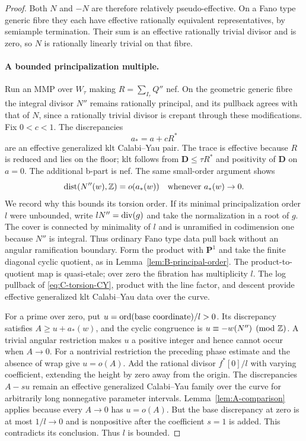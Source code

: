 \begin{proof}
Both $N$ and $-N$ are therefore relatively pseudo-effective.  On a
Fano type generic fibre they each have effective rationally equivalent
representatives, by semiample termination.  Their sum is an effective
rationally trivial divisor and is zero, so $N$ is rationally linearly
trivial on that fibre.

\paragraph{A bounded principalization multiple.}
Run an MMP over $W_\tau$ making $R=\sum_{I_\tau}Q''$ nef.  On the
geometric generic fibre the integral divisor $N''$ remains rationally
principal, and its pullback agrees with that of $N$, since a
rationally trivial divisor is crepant through these modifications.
Fix $0<c<1$.  The discrepancies
\begin{equation}\label{eq:C-torsion-CY}
                              a_*=a+cR^*
\end{equation}
are an effective generalized klt Calabi--Yau pair.  The trace is
effective because $R$ is reduced and lies on the floor; klt follows
from $\mathbf D\leq\tau R^*$ and positivity of $\mathbf D$ on
$a=0$.  The additional b-part is nef.  The same small-order argument
shows
\[
       \operatorname{dist}(N''(w),\mathbb Z)=o(a_*(w))
                          \quad\text{whenever }a_*(w)\to0.
\]
We record why this bounds its torsion order.  If its minimal
principalization order $l$ were unbounded, write
$lN''=\operatorname{div}(g)$ and take the normalization in a root of $g$.
The cover is connected by minimality of $l$ and is unramified in
codimension one because $N''$ is integral.  Thus ordinary Fano type
data pull back without an angular ramification boundary.  Form the
product with $\mathbf P^1$ and take the finite diagonal cyclic
quotient, as in Lemma~\ref{lem:B-principal-order}.  The product-to-quotient
map is quasi-etale; over zero the fibration has multiplicity $l$.
The log pullback of \eqref{eq:C-torsion-CY}, product with the line
factor, and descent provide effective generalized klt Calabi--Yau
data over the curve.

For a prime over zero, put
$u=\operatorname{ord}(\text{base coordinate})/l>0$.  Its discrepancy satisfies
$A\geq u+a_*(w)$, and the cyclic congruence is
$u\equiv-w(N'')\pmod{\mathbb Z}$.  A trivial angular restriction makes $u$
a positive integer and hence cannot occur when $A\to0$.  For a
nontrivial restriction the preceding phase estimate and the absence of
wrap give $u=o(A)$.  Add the rational divisor $f^*[0]/l$ with varying coefficient, extending
the height by zero away from the origin.  The discrepancies $A-su$ remain an
effective generalized Calabi--Yau family over the curve for arbitrarily
long nonnegative parameter intervals.  Lemma~\ref{lem:A-comparison}
applies because every $A\to0$ has $u=o(A)$.  But the base discrepancy
at zero is at most $1/l\to0$ and is nonpositive after the coefficient
$s=1$ is added.  This contradicts its conclusion.  Thus $l$ is bounded.


\end{proof}

